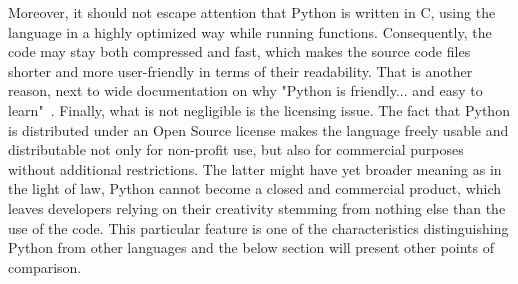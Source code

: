 Moreover, it should not escape attention that Python is written in C, using the language in a highly optimized way while running functions. Consequently, the code may stay both compressed and fast, which makes the source code files shorter and more user-friendly in terms of their readability. That is another reason, next to wide documentation on why "Python is friendly... and easy to learn"~\cite{py_about}. Finally, what is not negligible is the licensing issue. The fact that Python is distributed under an Open Source license makes the language freely usable and distributable not only for non-profit use, but also for commercial purposes without additional restrictions. The latter might have yet broader meaning as in the light of law, Python cannot become a closed and commercial product, which leaves developers relying on their creativity stemming from nothing else than the use of the code. This particular feature is one of the characteristics distinguishing Python from other languages and the below section will present other points of comparison.

